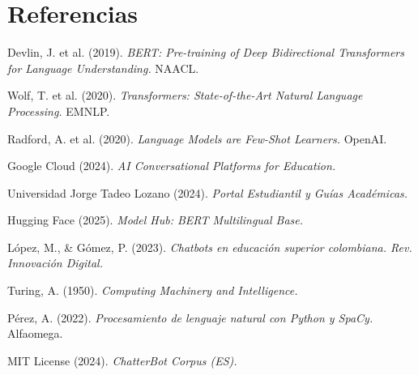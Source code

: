 \documentclass[11pt,letterpaper]{article}
\begin{document}
\section*{Referencias}
\begin{enumerate}[label={[\arabic*]}]
\item Devlin, J. et al. (2019). \textit{BERT: Pre-training of Deep Bidirectional Transformers for Language Understanding.} NAACL.
\item Wolf, T. et al. (2020). \textit{Transformers: State-of-the-Art Natural Language Processing.} EMNLP.
\item Radford, A. et al. (2020). \textit{Language Models are Few-Shot Learners.} OpenAI.
\item Google Cloud (2024). \textit{AI Conversational Platforms for Education.}
\item Universidad Jorge Tadeo Lozano (2024). \textit{Portal Estudiantil y Guías Académicas.}
\item Hugging Face (2025). \textit{Model Hub: BERT Multilingual Base.}
\item López, M., \& Gómez, P. (2023). \textit{Chatbots en educación superior colombiana. Rev. Innovación Digital.}
\item Turing, A. (1950). \textit{Computing Machinery and Intelligence.}
\item Pérez, A. (2022). \textit{Procesamiento de lenguaje natural con Python y SpaCy.} Alfaomega.
\item MIT License (2024). \textit{ChatterBot Corpus (ES).}
\end{enumerate}
\end{document}
